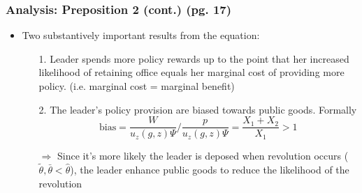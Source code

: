 \documentclass[10pt,handout]{beamer}
\begin{document}
\begin{frame}
\frametitle{Analysis: Preposition 2 (cont.) (pg. 17)}
\begin{itemize}
    \item Two substantively important results from the equation:
    \begin{itemize}
        \item[1.] Leader spends more policy rewards up to the point that her increased likelihood of retaining office equals her marginal cost of providing more policy. (i.e. marginal cost = marginal benefit)
        \item[2.] The leader's policy provision are biased towards public goods. Formally
        \[
            \text{bias} = \frac{W}{u_z(g, z)\Psi}/\frac{p}{u_z(g, z)\Psi} = \frac{X_1+X_2}{X_1} > 1
        \]
        \item[] $\Rightarrow$ Since it's more likely the leader is deposed when revolution occurs ($\tilde{\theta}, \bar{\theta} < \hat{\theta}$), the leader enhance public goods to reduce the likelihood of the revolution
    \end{itemize}
\end{itemize}
\end{frame}
\end{document}

